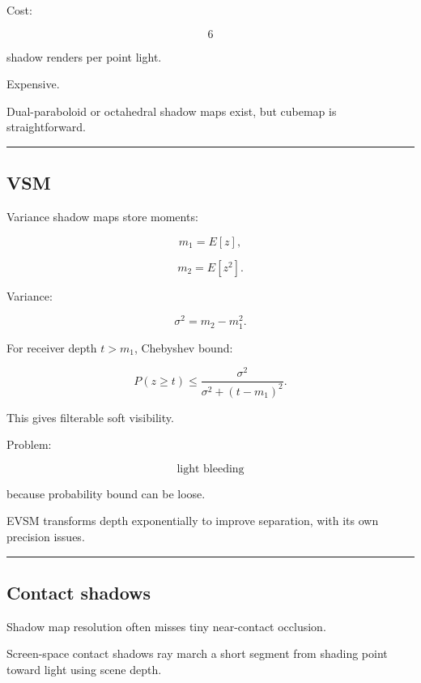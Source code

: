 Cost:

\[
6
\]

shadow renders per point light.

Expensive.

Dual-paraboloid or octahedral shadow maps exist, but cubemap is straightforward.

\begin{center}\rule{0.5\linewidth}{0.5pt}\end{center}

\subsection{VSM}\label{04-visual-computing-ii-ch040-vsm}

\hypertarget{04-visual-computing-ii-ch040-vsm}{}

Variance shadow maps store moments:

\[
m_1=E[z],
\]

\[
m_2=E[z^2].
\]

Variance:

\[
\sigma^2=
m_2-m_1^2.
\]

For receiver depth \(t>m_1\), Chebyshev bound:

\[
\boxed{
P(z\ge t)
\le
\frac{
\sigma^2
}{
\sigma^2+(t-m_1)^2
}.
}
\]

This gives filterable soft visibility.

Problem:

\[
\boxed{\text{light bleeding}}
\]

because probability bound can be loose.

EVSM transforms depth exponentially to improve separation, with its own precision issues.

\begin{center}\rule{0.5\linewidth}{0.5pt}\end{center}

\subsection{Contact shadows}\label{04-visual-computing-ii-ch040-contact-shadows}

\hypertarget{04-visual-computing-ii-ch040-contact-shadows}{}

Shadow map resolution often misses tiny near-contact occlusion.

Screen-space contact shadows ray march a short segment from shading point toward light using scene depth.

